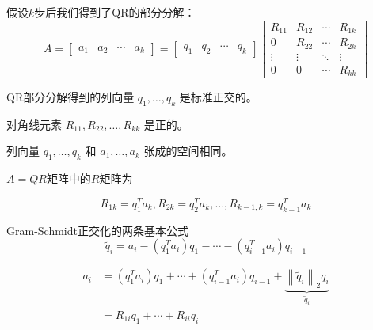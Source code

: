 假设$k$步后我们得到了QR的部分分解：
\begin{equation}
A=\left[\begin{array}{llll}
a_{1} & a_{2} & \cdots & a_{k}
\end{array}\right]=\left[\begin{array}{llll}
q_{1} & q_{2} & \cdots & q_{k}
\end{array}\right]\left[\begin{array}{cccc}
R_{11} & R_{12} & \cdots & R_{1 k} \\
0 & R_{22} & \cdots & R_{2 k} \\
\vdots & \vdots & \ddots & \vdots \\
0 & 0 & \cdots & R_{k k}
\end{array}\right]
\end{equation}

\begin{corollary}
    QR部分分解得到的列向量 $q_{1}, \ldots, q_{k}$ 是标准正交的。
\end{corollary}

\begin{corollary}
    对角线元素 $R_{11}, R_{22}, \ldots, R_{k k}$ 是正的。
\end{corollary}

\begin{corollary}
    列向量 $q_{1}, \ldots, q_{k}$ 和 $a_{1}, \ldots, a_{k}$ 张成的空间相同。
\end{corollary}

\begin{theorem}
$A = Q R$矩阵中的$R$矩阵为

    \begin{equation}R_{1 k}=q_{1}^{T} a_{k},  R_{2 k}=q_{2}^{T} a_{k}, \ldots,  R_{k-1, k}=q_{k-1}^{T} a_{k}\end{equation}
\end{theorem}

\begin{remark}
    Gram-Schmidt正交化的两条基本公式
    \begin{equation} \tilde{q}_{i}=a_{i}-\left(q_{1}^{T} a_{i}\right) q_{1}-\cdots-\left(q_{i-1}^{T} a_{i}\right) q_{i-1} \end{equation}

    \begin{equation} \begin{aligned}
        a_{i}&=\left(q_{1}^{T} a_{i}\right) q_{1}+\cdots+\left(q_{i-1}^{T} a_{i}\right) q_{i-1} +\underbrace{
\left\|\tilde{q}_{i}\right\|_{2} q_{i}}_{\tilde{q}_{i}}
        \\ &=R_{1 i} q_{1}+\cdots+R_{i i} q_{i}
    \end{aligned}
      \end{equation}
\end{remark}

